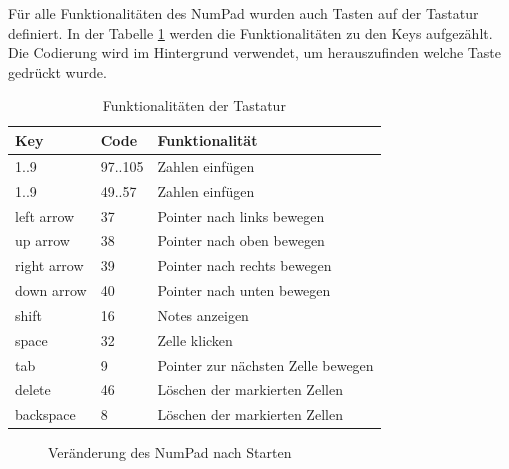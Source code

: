 Für alle Funktionalitäten des NumPad wurden auch Tasten auf der Tastatur definiert. In der Tabelle \ref{tab:tastatur} werden die Funktionalitäten zu den Keys aufgezählt. Die Codierung wird im Hintergrund verwendet, um herauszufinden welche Taste gedrückt wurde.

\begin{table}[H]
	\centering
	\begin{tabular}{lll}
		\hline
		Key         & Code    & Funktionalität                     \\ \hline
		1..9        & 97..105 & Zahlen einfügen                    \\
		1..9        & 49..57  & Zahlen einfügen                    \\
		left arrow  & 37      & Pointer nach links bewegen         \\
		up arrow    & 38      & Pointer nach oben bewegen          \\
		right arrow & 39      & Pointer nach rechts bewegen        \\
		down arrow  & 40      & Pointer nach unten bewegen         \\
		shift       & 16      & Notes anzeigen                     \\
		space       & 32      & Zelle klicken                      \\
		tab         & 9       & Pointer zur nächsten Zelle bewegen \\
		delete      & 46      & Löschen der markierten Zellen      \\
		backspace   & 8       & Löschen der markierten Zellen      \\ \hline
	\end{tabular}%
	\caption{Funktionalitäten der Tastatur}
	\label{tab:tastatur}
\end{table}



\begin{figure}[H]
	\centering
	\qquad
	\caption{Veränderung des NumPad nach Starten}%
\end{figure}

